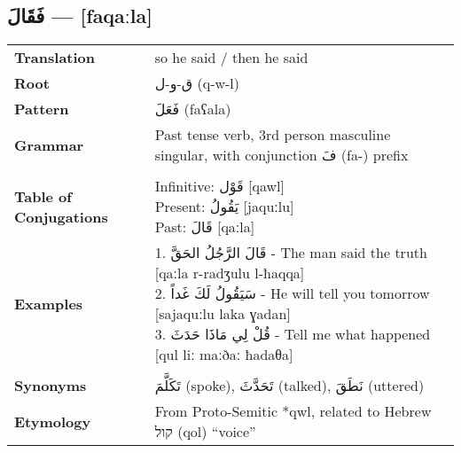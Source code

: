 \documentclass[a4paper,12pt]{article}
\begin{document}
\subsection{\textarabic{فَقَالَ} — [faqaːla]}
\begin{tabular}{p{3cm}p{10cm}}
\toprule
\textbf{Translation} & so he said / then he said \\
\textbf{Root} & \textarabic{ق-و-ل} (q-w-l) \\
\textbf{Pattern} & \textarabic{فَعَلَ} (faʕala) \\
\textbf{Grammar} & Past tense verb, 3rd person masculine singular, with conjunction \textarabic{فَ} (fa-) prefix \\
\midrule \\
\textbf{Table of Conjugations} &  \makecell[l]{
Infinitive: \textarabic{قَوْل} [qawl] \\
Present: \textarabic{يَقُولُ} [jaquːlu] \\
Past: \textarabic{قَالَ} [qaːla]
} \\
\midrule
\textbf{Examples} & \makecell[l]{\parbox{9.5cm}{
1. \textarabic{قَالَ الرَّجُلُ الحَقَّ} - The man said the truth [qaːla r-radʒulu l-ħaqqa]\\
2. \textarabic{سَيَقُولُ لَكَ غَداً} - He will tell you tomorrow [sajaquːlu laka ɣadan]\\
3. \textarabic{قُلْ لِي مَاذَا حَدَثَ} - Tell me what happened [qul liː maːðaː ħadaθa]
} } \\
\midrule \\
\textbf{Synonyms} & \textarabic{تَكَلَّمَ} (spoke), \textarabic{تَحَدَّثَ} (talked), \textarabic{نَطَقَ} (uttered) \\
\textbf{Etymology} & From Proto-Semitic *qwl, related to Hebrew \texthebrew{קול} (qol) ``voice'' \\
\bottomrule
\end{tabular}
\end{document}
